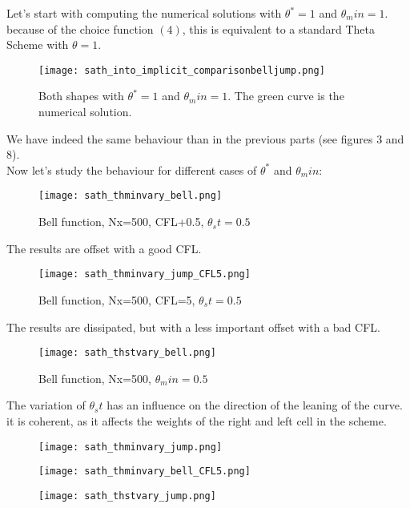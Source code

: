\documentclass[12pt]{article}
\begin{document}
Let's start with computing the numerical solutions with $\theta^* = 1$ and $\theta_min = 1$.
because of the choice function $(4)$, this is equivalent to a standard Theta Scheme with $\theta = 1$.

\begin{figure}[H]
    \centering
    \texttt{[image: sath\_into\_implicit\_comparisonbelljump.png]}
    \caption{Both shapes with $\theta^* = 1$ and $\theta_min = 1$. The green curve is the numerical solution.}
\end{figure}
We have indeed the same behaviour than in the previous parts (see figures 3 and 8).\\

Now let's study the behaviour for different cases of $\theta^*$ and $\theta_min$:

\begin{figure}[H]
    \centering
    \texttt{[image: sath\_thminvary\_bell.png]}
    \caption{Bell function, Nx=500, CFL+0.5, $\theta_st=0.5$}
\end{figure}
The results are offset with a good CFL.

\begin{figure}[H]
    \centering
    \texttt{[image: sath\_thminvary\_jump\_CFL5.png]}
    \caption{Bell function, Nx=500, CFL=5, $\theta_st=0.5$}
\end{figure}
The results are dissipated, but with a less important offset with a  bad CFL.

\begin{figure}[H]
    \centering
    \texttt{[image: sath\_thstvary\_bell.png]}
    \caption{Bell function, Nx=500, $\theta_min=0.5$}
\end{figure}
The variation of $\theta_st$ has an influence on the direction of the leaning of the curve. it is coherent, as it affects the weights of the right and left cell in the scheme.

\begin{figure}[H]
    \centering
    \texttt{[image: sath\_thminvary\_jump.png]}
\end{figure}

\begin{figure}[H]
    \centering
    \texttt{[image: sath\_thminvary\_bell\_CFL5.png]}
\end{figure}

\begin{figure}[H]
    \centering
    \texttt{[image: sath\_thstvary\_jump.png]}
\end{figure}
\end{document}
